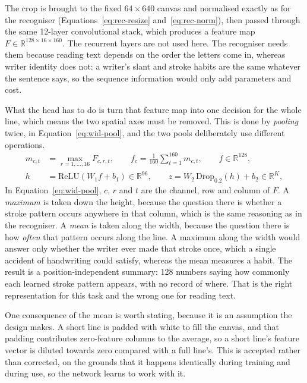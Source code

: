 The crop is brought to the fixed $64\times640$ canvas and normalised exactly as for the recogniser (Equations~\ref{eq:rec-resize} and~\ref{eq:rec-norm}), then passed through the same 12-layer convolutional stack, which produces a feature map $F\in\mathbb R^{128\times16\times160}$. The recurrent layers are not used here. The recogniser needs them because reading text depends on the order the letters come in, whereas writer identity does not: a writer's slant and stroke habits are the same whatever the sentence says, so the sequence information would only add parameters and cost.

What the head has to do is turn that feature map into one decision for the whole line, which means the two spatial axes must be removed. This is done by \emph{pooling} twice, in Equation~\ref{eq:wid-pool}, and the two pools deliberately use different operations.
\begin{align}
m_{c,t}&=\max_{r=1,\ldots,16}F_{c,r,t},\qquad f_c=\frac1{160}\sum_{t=1}^{160}m_{c,t},\qquad f\in\mathbb R^{128},\label{eq:wid-pool}\\
h&=\mathrm{ReLU}(W_1f+b_1)\in\mathbb R^{96},\qquad z=W_2\,\mathrm{Drop}_{0.2}(h)+b_2\in\mathbb R^{K},\label{eq:wid-head}
\end{align}
In Equation~\ref{eq:wid-pool}, $c$, $r$ and $t$ are the channel, row and column of $F$. A \emph{maximum} is taken down the height, because the question there is whether a stroke pattern occurs anywhere in that column, which is the same reasoning as in the recogniser. A \emph{mean} is taken along the width, because the question there is how \emph{often} that pattern occurs along the line. A maximum along the width would answer only whether the writer ever made that stroke once, which a single accident of handwriting could satisfy, whereas the mean measures a habit. The result is a position-independent summary: 128 numbers saying how commonly each learned stroke pattern appears, with no record of where. That is the right representation for this task and the wrong one for reading text.

One consequence of the mean is worth stating, because it is an assumption the design makes. A short line is padded with white to fill the canvas, and that padding contributes zero-feature columns to the average, so a short line's feature vector is diluted towards zero compared with a full line's. This is accepted rather than corrected, on the grounds that it happens identically during training and during use, so the network learns to work with it.

